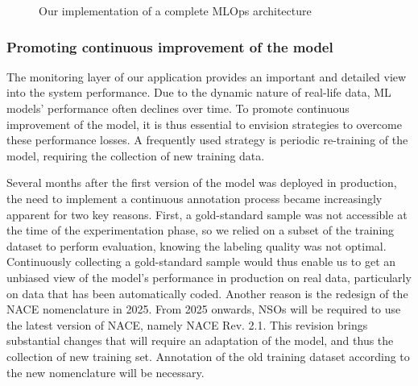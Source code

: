 \documentclass[graybox]{svmult}
\begin{document}
\begin{figure}[htbp]
    \centering
    \caption{Our implementation of a complete MLOps architecture}
    \label{fig:full-architecture}
\end{figure}

\subsubsection{Promoting continuous improvement of the model}
\label{subsubsec:annotation}

The monitoring layer of our application provides an important and detailed view into the system performance. Due to the dynamic nature of real-life data, ML models' performance often declines over time. To promote continuous improvement of the model, it is thus essential to envision strategies to overcome these performance losses. A frequently used strategy is periodic re-training of the model, requiring the collection of new training data.

Several months after the first version of the model was deployed in production, the need to implement a continuous annotation process became increasingly apparent for two key reasons. First, a gold-standard sample was not accessible at the time of the experimentation phase, so we relied on a subset of the training dataset to perform evaluation, knowing the labeling quality was not optimal. Continuously collecting a gold-standard sample would thus enable us to get an unbiased view of the model's performance in production on real data, particularly on data that has been automatically coded. Another reason is the redesign of the NACE nomenclature in 2025. From 2025 onwards, NSOs will be required to use the latest version of NACE, namely NACE Rev. 2.1. This revision brings substantial changes that will require an adaptation of the model, and thus the collection of new training set. Annotation of the old training dataset according to the new nomenclature will be necessary.
\end{document}
